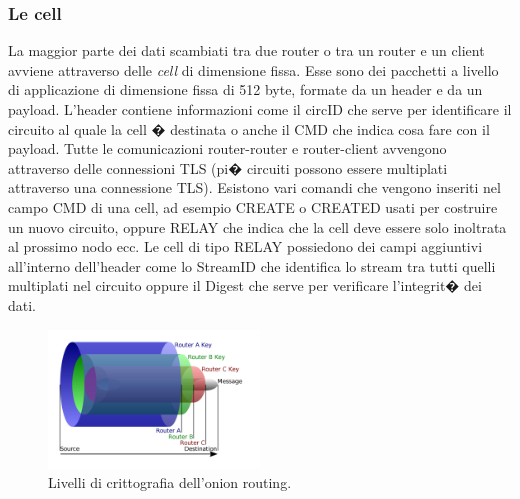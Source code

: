 \subsubsection{Le cell}
La maggior parte dei dati scambiati tra due router o tra un router e un client avviene attraverso delle \emph{cell} di dimensione fissa. Esse sono dei pacchetti a livello di applicazione di dimensione fissa di 512 byte, formate da un header e da un payload. L'header contiene informazioni come il circID che serve per identificare il circuito al quale la cell � destinata o anche il CMD che indica cosa fare con il payload. Tutte le comunicazioni router-router e router-client avvengono attraverso delle connessioni TLS (pi� circuiti possono essere multiplati attraverso una connessione TLS). Esistono vari comandi che vengono inseriti nel campo CMD di una cell, ad esempio {\ttfamily CREATE} o {\ttfamily CREATED} usati per costruire un nuovo circuito, oppure {\ttfamily RELAY} che indica che la cell deve essere solo inoltrata al prossimo nodo ecc. Le cell di tipo  {\ttfamily RELAY} possiedono dei campi aggiuntivi all'interno dell'header come lo StreamID che identifica lo stream tra tutti quelli multiplati nel circuito oppure il Digest che serve per verificare l'integrit� dei dati.
\begin{figure}[!htbp]
\centering
\includegraphics[width=0.5\textwidth]{./figure//strat}
\caption{Livelli di crittografia dell'onion routing.}
\label{FIG:strat}
\end{figure}

